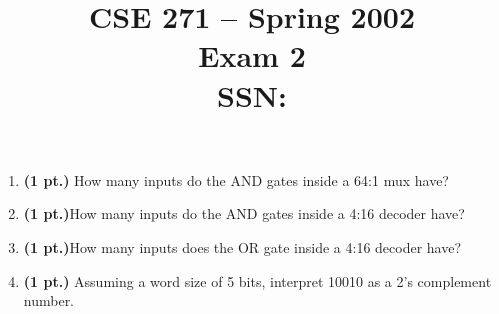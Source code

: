\documentclass{article}
\begin{document}
\newcommand{\bs}{\backslash}


\title{
\Huge{CSE 271 -- Spring 2002}\\
\normalsize{Exam 2}\\
SSN:}
\date{}

\maketitle{}

\begin{enumerate}
\item {\bf (1 pt.)} How many inputs do the AND gates inside a 64:1 mux have?

\item {\bf (1 pt.)}How many inputs do the AND gates inside a 4:16 decoder have?

\item {\bf (1 pt.)}How many inputs does the OR gate inside a 4:16 decoder have?

\item {\bf (1 pt.)} Assuming a word size of 5 bits, interpret 10010 as a 2's complement
number.


\end{enumerate}
\end{document}
